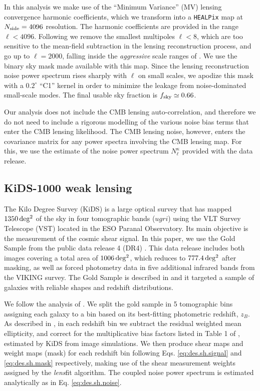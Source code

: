 \documentclass[a4paper,11pt]{article}
\newcommand{\fsky}{f_{\rm sky}}
\newcommand{\healpix}{\texttt{HEALPix}\xspace}
\newcommand{\kids}{KiDS\xspace}
\begin{document}
      In this analysis we make use of the ``Minimum Variance'' (MV) lensing convergence harmonic coefficients, which we transform into a \healpix map at $N_{\rm side}=4096$ resolution. The harmonic coefficients are provided in the range $\ell<4096$. Following \cite{1502.01591, 1807.06210} we remove the smallest multipoles $\ell < 8$, which are too sensitive to the mean-field subtraction in the lensing reconstruction process,  and go up to $\ell = 2000$, falling inside the \textit{aggressive} scale ranges of \cite{1807.06210}. We use the binary sky mask made available with this map. Since the lensing reconstruction noise power spectrum rises sharply with $\ell$ on small scales, we apodize this mask with a $0.2^\circ$ ``C1'' kernel \cite{1809.09603} in order to minimize the leakage from noise-dominated small-scale modes. The final usable sky fraction is $\fsky \simeq 0.66$.
      
      Our analysis does not include the CMB lensing auto-correlation, and therefore we do not need to include a rigorous modelling of the various noise bias terms that enter the CMB lensing likelihood. The CMB lensing noise, however, enters the covariance matrix for any power spectra involving the CMB lensing map. For this, we use the estimate of the noise power spectrum $N_\ell^{\kappa}$ provided with the data release.

    \subsection{KiDS-1000 weak lensing}\label{ssec:data.KiDS}
      The Kilo Degree Survey (\kids) is a large optical survey that has mapped $\unit[1350]{deg^2}$ of the sky in four tomographic bands ($ugri$) using the VLT Survey Telescope (VST) located in the ESO Paranal Observatory. Its main objective is the measurement of the cosmic shear signal. In this paper, we use  the Gold Sample from the public data release 4 (DR4) \cite{1902.11265}. This data release includes both images covering a total area of $\unit[1006]{deg^2}$, which reduces to $\unit[777.4]{deg^2}$ after masking, as well as forced photometry data in five additional infrared bands from the VIKING survey. The Gold Sample is described in \cite{1902.11265,2007.01845} and it targeted a sample of galaxies with reliable shapes and redshift distributions.
      
      We follow the analysis of \cite{2007.15633}. We split the gold sample in 5 tomographic bins assigning each galaxy to a bin based on its best-fitting photometric redshift, $z_B$. As described in \cite{2007.01845}, in each redshift bin we subtract the residual weighted mean ellipticity, and correct for the multiplicative bias factors listed in Table 1 of \cite{2007.15633}, estimated by \kids from image simulations. We then produce shear maps and weight maps (mask) for each redshift bin following Eqs. \ref{eq:des.sh.signal} and \ref{eq:des.sh.mask} respectively, making use of the shear measurement weights assigned by the {\sl lens}fit algorithm. The coupled noise power spectrum is estimated analytically as in Eq. \ref{eq:des.sh.noise}.
\end{document}
